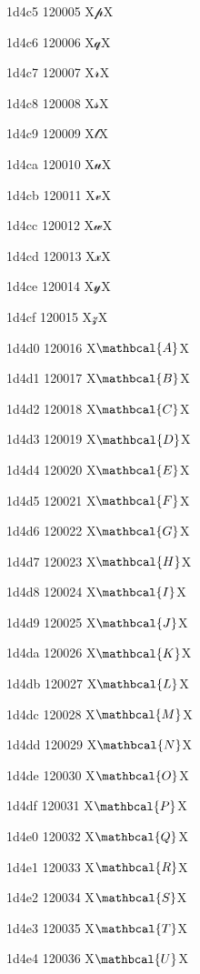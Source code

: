 \documentclass[11pt]{article}
\begin{document}
1d4c5 120005 X{\ensuremath{\mathscr{p}}}X

1d4c6 120006 X{\ensuremath{\mathscr{q}}}X

1d4c7 120007 X{\ensuremath{\mathscr{r}}}X

1d4c8 120008 X{\ensuremath{\mathscr{s}}}X

1d4c9 120009 X{\ensuremath{\mathscr{t}}}X

1d4ca 120010 X{\ensuremath{\mathscr{u}}}X

1d4cb 120011 X{\ensuremath{\mathscr{v}}}X

1d4cc 120012 X{\ensuremath{\mathscr{w}}}X

1d4cd 120013 X{\ensuremath{\mathscr{x}}}X

1d4ce 120014 X{\ensuremath{\mathscr{y}}}X

1d4cf 120015 X{\ensuremath{\mathscr{z}}}X

1d4d0 120016 X{\ensuremath{\mathbcal{A}}}X

1d4d1 120017 X{\ensuremath{\mathbcal{B}}}X

1d4d2 120018 X{\ensuremath{\mathbcal{C}}}X

1d4d3 120019 X{\ensuremath{\mathbcal{D}}}X

1d4d4 120020 X{\ensuremath{\mathbcal{E}}}X

1d4d5 120021 X{\ensuremath{\mathbcal{F}}}X

1d4d6 120022 X{\ensuremath{\mathbcal{G}}}X

1d4d7 120023 X{\ensuremath{\mathbcal{H}}}X

1d4d8 120024 X{\ensuremath{\mathbcal{I}}}X

1d4d9 120025 X{\ensuremath{\mathbcal{J}}}X

1d4da 120026 X{\ensuremath{\mathbcal{K}}}X

1d4db 120027 X{\ensuremath{\mathbcal{L}}}X

1d4dc 120028 X{\ensuremath{\mathbcal{M}}}X

1d4dd 120029 X{\ensuremath{\mathbcal{N}}}X

1d4de 120030 X{\ensuremath{\mathbcal{O}}}X

1d4df 120031 X{\ensuremath{\mathbcal{P}}}X

1d4e0 120032 X{\ensuremath{\mathbcal{Q}}}X

1d4e1 120033 X{\ensuremath{\mathbcal{R}}}X

1d4e2 120034 X{\ensuremath{\mathbcal{S}}}X

1d4e3 120035 X{\ensuremath{\mathbcal{T}}}X

1d4e4 120036 X{\ensuremath{\mathbcal{U}}}X
\end{document}
